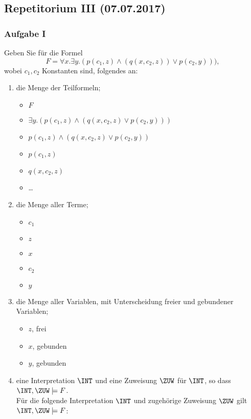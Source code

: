 \newcommand{\SUBINT}{\mathcal{J}}
\subsection*{Repetitorium III (07.07.2017)}
\subsubsection*{Aufgabe I}
Geben Sie für die Formel
\begin{equation*}
F = \forall x.\exists y.(p(c_1,z) \land (q(x,c_2,z)) \lor p(c_2,y))),
\end{equation*}
wobei $c_1,c_2$ Konstanten sind, folgendes an:
\begin{enumerate}
	\item die Menge der Teilformeln; \\
	\LOES 
	\begin{itemize}
	\item $F$
	\item $\exists y.(p(c_1,z) \land (q(x, c_2, z) \lor p(c_2,y)))$
	\item $p(c_1,z) \land (q(x,c_2,z) \lor p(c_2, y))$
	\item $p(c_1, z)$
	\item $q(x,c_2,z)$
	\item \dots
	\end{itemize}
	\item die Menge aller Terme; \\
	\LOES
	\begin{itemize}
	\item $c_1$
	\item $z$
	\item $x$
	\item $c_2$
	\item $y$
	\end{itemize}
	\item die Menge aller Variablen, mit Unterscheidung freier und gebundener Variablen; \\
	\LOES
	\begin{itemize}
	\item $z$, frei
	\item $x$, gebunden
	\item $y$, gebunden
	\end{itemize}
	\item eine Interpretation $\INT$ und eine Zuweisung $\ZUW$ für $\INT$, so dass $\INT,\ZUW \models F$. \\
\LOES Für die folgende Interpretation $\INT$ und zugehörige Zuweisung $\ZUW$ gilt $\INT, \ZUW \models F$:

\end{enumerate}

